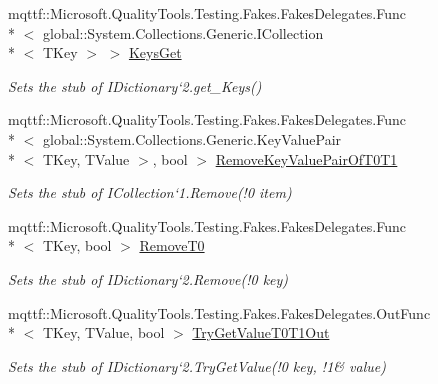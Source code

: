 \begin{DoxyCompactItemize}
mqttf\-::\-Microsoft.\-Quality\-Tools.\-Testing.\-Fakes.\-Fakes\-Delegates.\-Func\\*
$<$ global\-::\-System.\-Collections.\-Generic.\-I\-Collection\\*
$<$ T\-Key $>$ $>$ \hyperlink{class_system_1_1_collections_1_1_generic_1_1_fakes_1_1_stub_i_dictionary_3_01_t_key_00_01_t_value_01_4_acca6cc891ade76fa2bffa664d552d3fe}{Keys\-Get}
\begin{DoxyCompactList}\small\item\em Sets the stub of I\-Dictionary`2.get\-\_\-\-Keys()\end{DoxyCompactList}\item 
mqttf\-::\-Microsoft.\-Quality\-Tools.\-Testing.\-Fakes.\-Fakes\-Delegates.\-Func\\*
$<$ global\-::\-System.\-Collections.\-Generic.\-Key\-Value\-Pair\\*
$<$ T\-Key, T\-Value $>$, bool $>$ \hyperlink{class_system_1_1_collections_1_1_generic_1_1_fakes_1_1_stub_i_dictionary_3_01_t_key_00_01_t_value_01_4_a00f3d0d0e92599c951a8aa1f05a9cc35}{Remove\-Key\-Value\-Pair\-Of\-T0\-T1}
\begin{DoxyCompactList}\small\item\em Sets the stub of I\-Collection`1.Remove(!0 item)\end{DoxyCompactList}\item 
mqttf\-::\-Microsoft.\-Quality\-Tools.\-Testing.\-Fakes.\-Fakes\-Delegates.\-Func\\*
$<$ T\-Key, bool $>$ \hyperlink{class_system_1_1_collections_1_1_generic_1_1_fakes_1_1_stub_i_dictionary_3_01_t_key_00_01_t_value_01_4_a53ca83be681c7d93d1f29f0c2376e0f7}{Remove\-T0}
\begin{DoxyCompactList}\small\item\em Sets the stub of I\-Dictionary`2.Remove(!0 key)\end{DoxyCompactList}\item 
mqttf\-::\-Microsoft.\-Quality\-Tools.\-Testing.\-Fakes.\-Fakes\-Delegates.\-Out\-Func\\*
$<$ T\-Key, T\-Value, bool $>$ \hyperlink{class_system_1_1_collections_1_1_generic_1_1_fakes_1_1_stub_i_dictionary_3_01_t_key_00_01_t_value_01_4_a27d266d4de2ffca8a220cbe290439e23}{Try\-Get\-Value\-T0\-T1\-Out}
\begin{DoxyCompactList}\small\item\em Sets the stub of I\-Dictionary`2.Try\-Get\-Value(!0 key, !1\& value)\end{DoxyCompactList}\item 

\end{DoxyCompactItemize}
